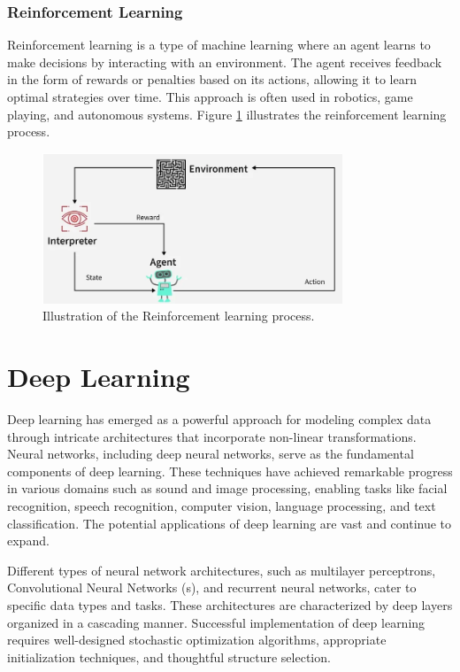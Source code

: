 \subsubsection{Reinforcement Learning}
Reinforcement learning is a type of machine learning where an agent learns to make decisions by interacting with an environment. The agent receives feedback in the form of rewards or penalties based on its actions, allowing it to learn optimal strategies over time. This approach is often used in robotics, game playing, and autonomous systems. Figure \ref{fig:reinforcement} illustrates the reinforcement learning process.
\begin{figure}[H]
  \centering
  \includegraphics[width=0.8\textwidth]{Images/Chapter1/reinforcement.png}
  \caption{Illustration of the Reinforcement learning process.\cite{geeksforgeeks2025supervised} }
  \label{fig:reinforcement}
\end{figure}


\section{Deep Learning}
\label{sec:dl}
Deep learning has emerged as a powerful approach for modeling complex data through intricate architectures that incorporate non-linear transformations. Neural networks, including deep neural networks, serve as the fundamental components of deep learning. These techniques have achieved remarkable progress in various domains such as sound and image processing, enabling tasks like facial recognition, speech recognition, computer vision, language processing, and text classification. The potential applications of deep learning are vast and continue to expand.

Different types of neural network architectures, such as multilayer perceptrons, Convolutional Neural Networks (s), and recurrent neural networks, cater to specific data types and tasks. These architectures are characterized by deep layers organized in a cascading manner. Successful implementation of deep learning requires well-designed stochastic optimization algorithms, appropriate initialization techniques, and thoughtful structure selection.

